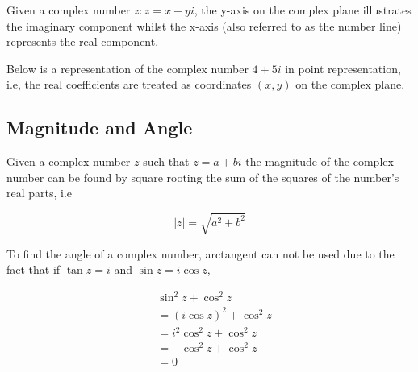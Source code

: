 \documentclass[12pt]{article}
\begin{document}
    Given a complex number $z: z=x+yi$, the y-axis on the complex plane illustrates
    the imaginary component whilst the x-axis (also referred to as the number line) 
    represents the real component. 

    Below is a representation of the complex number $4 + 5i$ in point representation, i.e, 
    the real coefficients are treated as coordinates $(x, y)$ on the complex plane. 

    \begin{center}
        

    \end{center}

    \subsection{Magnitude and Angle}

    Given a complex number $z$ such that $z = a + bi$ the magnitude of
    the complex number can be found by square rooting the sum of the squares
    of the number's real parts, i.e

    \[
        |z| = \sqrt{a^2 + b^2}    
    \]

    To find the angle of a complex number, arctangent can not be used due to the fact that if $\tan z = i$ and $\sin z = i\cos z$, 
    
    \[
        \begin{aligned}
            & \sin^2 z + \cos^2 z\\
            &= (i\cos z)^2 + \cos^2 z \\
            &= i^2\cos^2 z + \cos^2 z \\
            &= -\cos^2 z + \cos^2 z\\
            &= 0   
        \end{aligned}    
    \]
\end{document}

